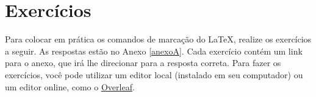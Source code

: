 %
%
%
\section{Exercícios}
\label{sec:exercicios}

Para colocar em prática os comandos de marcação do \LaTeX{}, realize os exercícios a seguir. As respostas estão no Anexo \ref{anexoA}. Cada exercício contém um link para o anexo, que irá lhe direcionar para a resposta correta. Para fazer os exercícios, você pode utilizar um editor local (instalado em seu computador) ou um editor online, como o \href{https://pt.overleaf.com/project}{Overleaf}.

